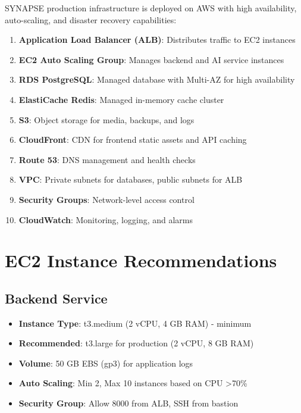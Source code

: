 \documentclass{report}
\begin{document}
SYNAPSE production infrastructure is deployed on AWS with high availability, auto-scaling, and disaster recovery capabilities:

\begin{enumerate}
  \item \textbf{Application Load Balancer (ALB)}: Distributes traffic to EC2 instances
  \item \textbf{EC2 Auto Scaling Group}: Manages backend and AI service instances
  \item \textbf{RDS PostgreSQL}: Managed database with Multi-AZ for high availability
  \item \textbf{ElastiCache Redis}: Managed in-memory cache cluster
  \item \textbf{S3}: Object storage for media, backups, and logs
  \item \textbf{CloudFront}: CDN for frontend static assets and API caching
  \item \textbf{Route 53}: DNS management and health checks
  \item \textbf{VPC}: Private subnets for databases, public subnets for ALB
  \item \textbf{Security Groups}: Network-level access control
  \item \textbf{CloudWatch}: Monitoring, logging, and alarms
\end{enumerate}

\section{EC2 Instance Recommendations}

\subsection{Backend Service}

\begin{itemize}
  \item \textbf{Instance Type}: t3.medium (2 vCPU, 4 GB RAM) - minimum
  \item \textbf{Recommended}: t3.large for production (2 vCPU, 8 GB RAM)
  \item \textbf{Volume}: 50 GB EBS (gp3) for application logs
  \item \textbf{Auto Scaling}: Min 2, Max 10 instances based on CPU >70\%
  \item \textbf{Security Group}: Allow 8000 from ALB, SSH from bastion
\end{itemize}
\end{document}
